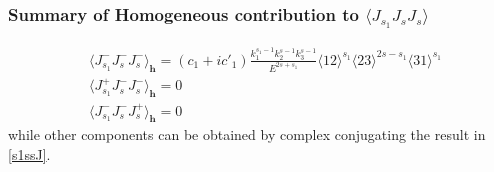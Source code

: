 \documentclass[a4paper,11pt]{article}
\begin{document}
\subsubsection*{Summary of Homogeneous contribution to {\bf{$\langle J_{s_1} J_s J_s \rangle$}}}
\begin{align}\label{s1ssJ}
&\langle J_{s_1}^- J_s^- J_s^-\rangle_{\textbf{h}} = \left(c_1+ i c'_1\right)\frac{k_1^{s_1-1}k_2^{s-1}k_3^{s-1}}{E^{2s+s_1}}\langle 12 \rangle^{s_1}\langle 23 \rangle^{2s-s_1}\langle 31 \rangle^{s_1}\\[5 pt]
&\langle J_{s_1}^+ J_s^- J_s^-\rangle_{\textbf{h}} = 0\\[5 pt]
&\langle J_{s_1}^- J_s^- J_s^+\rangle_{\textbf{h}} = 0
\end{align} while other components can be obtained by complex conjugating the result in \eqref{s1ssJ}.
\end{document}
